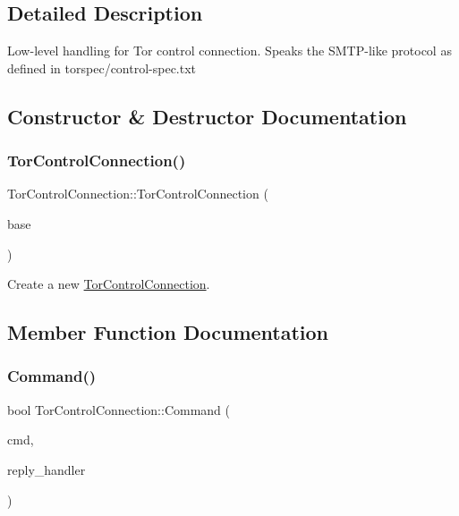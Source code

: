 \subsection{Detailed Description}
Low-\/level handling for Tor control connection. Speaks the S\+M\+T\+P-\/like protocol as defined in torspec/control-\/spec.\+txt 

\subsection{Constructor \& Destructor Documentation}
\mbox{\label{class_tor_control_connection_a5850ebb205bddf1fbc97271fae8eaf78}} 
\subsubsection{\texorpdfstring{TorControlConnection()}{TorControlConnection()}}
{\footnotesize\ttfamily Tor\+Control\+Connection\+::\+Tor\+Control\+Connection (\begin{DoxyParamCaption}\item[{struct event\+\_\+base $\ast$}]{base }\end{DoxyParamCaption})}

Create a new \mbox{\hyperlink{class_tor_control_connection}{Tor\+Control\+Connection}}. 

\subsection{Member Function Documentation}
\mbox{\label{class_tor_control_connection_a5d0292a1389bb0f78d15fe6c06a2baeb}} 
\subsubsection{\texorpdfstring{Command()}{Command()}}
{\footnotesize\ttfamily bool Tor\+Control\+Connection\+::\+Command (\begin{DoxyParamCaption}\item[{const std\+::string \&}]{cmd,  }\item[{const Reply\+Handler\+CB \&}]{reply\+\_\+handler }\end{DoxyParamCaption})}

